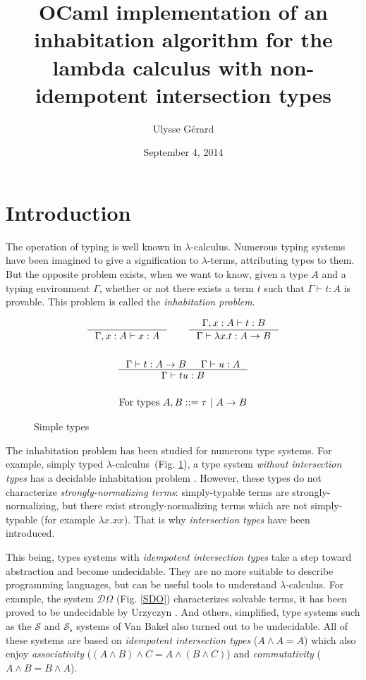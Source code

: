 \documentclass{article}
\title{\textbf{OCaml implementation of an inhabitation algorithm for the lambda calculus with non-idempotent intersection types}}
\author{Ulysse Gérard}
\date{September 4, 2014}
\def\lcalc{$\lambda$-calculus}
\def\lterms{$\lambda$-terms}
\def\ver{\ |\ }
\begin{document}
\maketitle

\section{Introduction}
The operation of typing is well known in \lcalc. Numerous typing systems have been imagined to give a signification to \lterms, attributing types to them. But the opposite problem exists, when we want to know, given a type $A$ and a typing environment $\Gamma$, whether or not there exists a term $t$ such that $\Gamma \vdash t : A$ is provable. This problem is called the \emph{inhabitation problem}.
\begin{figure}
    \begin{mdframed}
        \begin{gather*}
        \inference[]{}{\Gamma, x:A\vdash x:A}
        \qquad \inference[]{\Gamma, x:A \vdash t:B}{\Gamma \vdash \lambda x.t:A->B}
        \\ \\ \inference[]{\Gamma \vdash t : A -> B & \Gamma \vdash u : A} {\Gamma \vdash tu : B}
        \\ \\ \text{For types } A, B ::= \tau\ver A \rightarrow B
        \end{gather*}
    \end{mdframed}
    \caption{Simple types}
    \label{STY}
\end{figure}


The inhabitation problem has been studied for numerous type systems. For example, simply typed \lcalc\ (Fig. \ref{STY}), a type system \emph{without intersection types} has a decidable inhabitation problem \cite{Ben}. However, these types do not characterize \emph{strongly-normalizing terms}: simply-typable terms are strongly-normalizing, but there exist strongly-normalizing terms which are not simply-typable (for example $\lambda x.xx$). That is why \emph{intersection types} have been introduced.

This being, types systems with \emph{idempotent intersection types} take a step toward abstraction and become undecidable. They are no more suitable to describe programming languages, but can be useful tools to understand \lcalc. For example, the system $\mathcal{D}\Omega$ (Fig. \ref{SDO}) \cite{Kriv} characterizes solvable terms, it %
has been proved to be undecidable by Urzyczyn \cite{Urz}. And others, simplified, type systems such as the  $\mathcal{S}$ and $\mathcal{S_r}$ systems of Van Bakel \cite{VBak} also turned out to be undecidable. All of these systems are based on \emph{idempotent intersection types} ($A\wedge A = A$) which also enjoy \emph{associativity} ($(A\wedge B)\wedge C = A\wedge (B\wedge C)$) and \emph{commutativity} ($A\wedge B=B\wedge A$).
\end{document}
